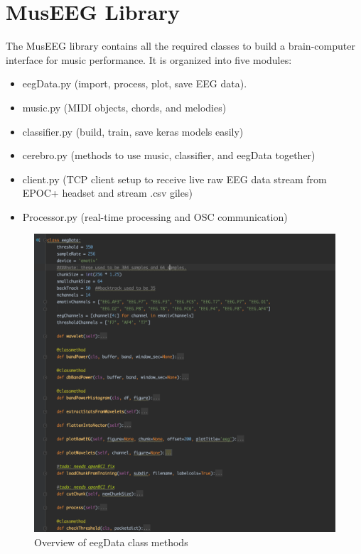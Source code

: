 \section{MusEEG Library}
The MusEEG library contains all the required classes to build a brain-computer interface for music performance. It is organized into five modules:
\begin{itemize}
\item eegData.py (import, process, plot, save EEG data).
\item music.py (MIDI objects, chords, and melodies)
\item classifier.py (build, train, save keras models easily)
\item cerebro.py (methods to use music, classifier, and eegData together)
\item client.py (TCP client setup to receive live raw EEG data stream from EPOC+ headset and stream .csv giles)
\item Processor.py (real-time processing and OSC communication)
\end{itemize}

 \begin{figure}[H]
	\centering
		\includegraphics[width=1\columnwidth]{eegDataClass.png}
	\caption{Overview of eegData class methods}
	\label{fig:eegDataClass}
\end{figure} 

